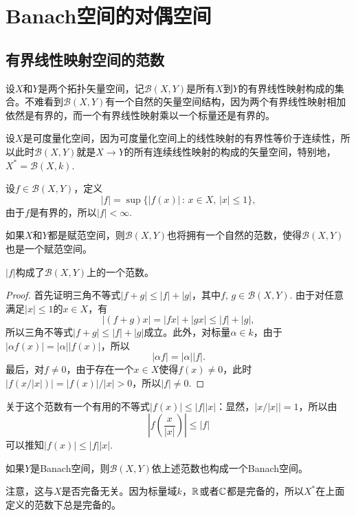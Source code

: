 \chapter{Banach空间的对偶空间}

\section{有界线性映射空间的范数}

\begin{para}
设$X$和$Y$是两个拓扑矢量空间，记$\mathcal{B}(X,Y)$是所有$X$到$Y$的有界线性映射构成的集合。不难看到$\mathcal{B}(X,Y)$有一个自然的矢量空间结构，因为两个有界线性映射相加依然是有界的，而一个有界线性映射乘以一个标量还是有界的。

设$X$是可度量化空间，因为可度量化空间上的线性映射的有界性等价于连续性，所以此时$\mathcal{B}(X,Y)$就是$X\to Y$的所有连续线性映射的构成的矢量空间，特别地，$X^*=\mathcal{B}(X,k)$.
\end{para}

设$f\in \mathcal{B}(X,Y)$，定义
\[
	|f|=\sup\bigl\{|f(x)|\,:\,x\in X,\,|x|\leq 1\bigr\},
\]
由于$f$是有界的，所以$|f|<\infty$. 

如果$X$和$Y$都是赋范空间，则$\mathcal{B}(X,Y)$也将拥有一个自然的范数，使得$\mathcal{B}(X,Y)$也是一个赋范空间。

\begin{lem}
$|f|$构成了$\mathcal{B}(X,Y)$上的一个范数。
\end{lem}

\begin{proof}
首先证明三角不等式$|f+g|\leq |f|+|g|$，其中$f$, $g\in \mathcal{B}(X,Y)$. 由于对任意满足$|x|\leq 1$的$x\in X$，有
\[
	|(f+g)x|=|fx|+|gx|\leq |f|+|g|,
\]
所以三角不等式$|f+g|\leq |f|+|g|$成立。此外，对标量$\alpha\in k$，由于$|\alpha f(x)|=|\alpha||f(x)|$，所以
\[
	|\alpha f|=|\alpha||f|.
\]
最后，对$f\neq 0$，由于存在一个$x\in X$使得$f(x)\neq 0$，此时$|f(x/|x|)|=|f(x)|/|x|>0$，所以$|f|\neq 0$.
\end{proof}

关于这个范数有一个有用的不等式$|f(x)|\leq |f||x|$：显然，$|x/|x||=1$，所以由
\[
	\left|f\left(\frac{x}{|x|}\right)\right|\leq |f|
\]
可以推知$|f(x)|\leq |f||x|$. 

\begin{pro}
如果$Y$是Banach空间，则$\mathcal{B}(X,Y)$依上述范数也构成一个Banach空间。
\end{pro}

注意，这与$X$是否完备无关。因为标量域$k$，$\mathbb{R}$或者$\mathbb{C}$都是完备的，所以$X^*$在上面定义的范数下总是完备的。

